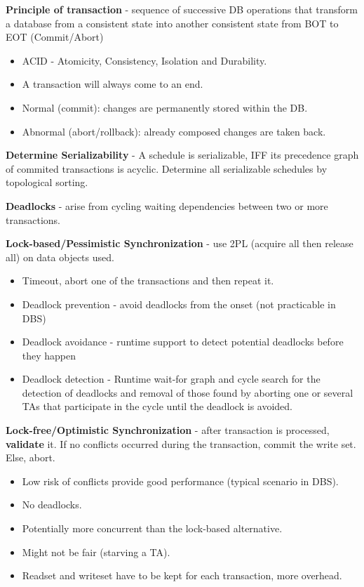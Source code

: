 \documentclass[]{article}
\begin{document}
\textbf{Principle of transaction} - sequence of successive DB operations that transform a database from a consistent state into another consistent state from BOT to EOT (Commit/Abort)
\begin{itemize}
\item ACID - Atomicity, Consistency, Isolation and Durability.
\item A transaction will always come to an end.
\item Normal (commit): changes are permanently stored within the DB.
\item Abnormal (abort/rollback): already composed changes are taken back.
\end{itemize}

\textbf{Determine Serializability} - A schedule is serializable, IFF its precedence graph of commited transactions is acyclic. Determine all serializable schedules by topological sorting.

\textbf{Deadlocks} - arise from cycling waiting dependencies between two or more transactions.

\textbf{Lock-based/Pessimistic Synchronization} - use 2PL (acquire all then release all) on data objects used.
\begin{itemize}
\item Timeout, abort one of the transactions and then repeat it.
\item Deadlock prevention - avoid deadlocks from the onset (not practicable in DBS)
\item Deadlock avoidance - runtime support to detect potential deadlocks before they happen
\item Deadlock detection - Runtime wait-for graph and cycle search for the detection of deadlocks and removal of those found by aborting one or several TAs that participate in the cycle until the deadlock is avoided.
\end{itemize}

\textbf{Lock-free/Optimistic Synchronization} - after transaction is processed, \textbf{validate} it. If no conflicts occurred during the transaction, commit the write set. Else, abort.
\begin{itemize}
\item Low risk of conflicts provide good performance (typical scenario in DBS).
\item No deadlocks.
\item Potentially more concurrent than the lock-based alternative.
\item Might not be fair (starving a TA).
\item Readset and writeset have to be kept for each transaction, more overhead.
\end{itemize}
\end{document}
